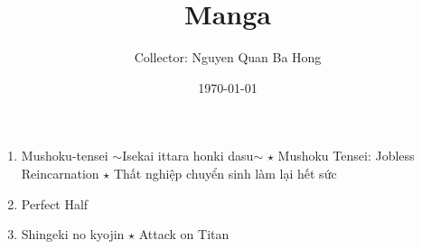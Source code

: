 \documentclass[onsided]{article}
\title{Manga}
\author{Collector: Nguyen Quan Ba Hong}
\date{\today}
\numberwithin{equation}{section}
\begin{document}
\maketitle
\setcounter{secnumdepth}{6}
\setcounter{tocdepth}{6}


\begin{enumerate}
    \item Mushoku-tensei $\sim$Isekai ittara honki dasu$\sim$ $\star$ Mushoku Tensei: Jobless Reincarnation $\star$ Thất nghiệp chuyển sinh làm lại hết sức
    \item Perfect Half
    \item Shingeki no kyojin $\star$ Attack on Titan
\end{enumerate}


\printbibliography[heading=bibintoc]
\end{document}
